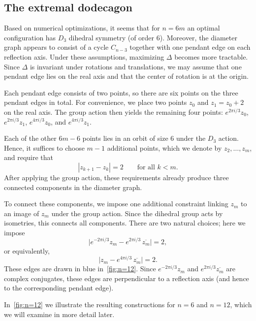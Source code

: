 \documentclass{article}
\theoremstyle{definition}
\begin{document}
\subsection{The extremal dodecagon}

Based on numerical optimizations, it seems that for $n=6m$ an optimal configuration has $D_3$ dihedral symmetry (of order $6$).
Moreover, the diameter graph appears to consist of a cycle $C_{n-3}$ together with one pendant edge on each reflection axis.
Under these assumptions, maximizing $\Delta$ becomes more tractable.
Since $\Delta$ is invariant under rotations and translations, we may assume that one pendant edge lies on the real axis and that the center of rotation is at the origin.

Each pendant edge consists of two points, so there are six points on the three pendant edges in total.
For convenience, we place two points $z_0$ and $z_1=z_0+2$ on the real axis.
The group action then yields the remaining four points:
$e^{2\pi i/3}z_0$, $e^{2\pi i/3}z_1$, $e^{4\pi i/3}z_0$, and $e^{4\pi i/3}z_1$.

Each of the other $6m-6$ points lies in an orbit of size $6$ under the $D_3$ action.
Hence, it suffices to choose $m-1$ additional points, which we denote by $z_2,\dots,z_m$, and require that
\[
|z_{k+1}-z_k|=2 \qquad \text{for all } k<m.
\]
After applying the group action, these requirements already produce three connected components in the diameter graph.

To connect these components, we impose one additional constraint linking $z_m$ to an image of $z_m$ under the group action.
Since the dihedral group acts by isometries, this connects all components.
There are two natural choices; here we impose
\[
\bigl|e^{-2\pi i/3} z_m - e^{2\pi i/3}\,\overline{z_m}\bigr|=2,
\]
or equivalently,
\[
\bigl|z_m - e^{4\pi i/3}\,\overline{z_m}\bigr|=2.
\]
These edges are drawn in blue in~\cref{fig:n=12}.
Since $e^{-2\pi i/3} z_m$ and $e^{2\pi i/3}\overline{z_m}$ are complex conjugates, these edges are perpendicular to a reflection axis (and hence to the corresponding pendant edge).

In~\cref{fig:n=12} we illustrate the resulting constructions for $n=6$ and $n=12$, which we will examine in more detail later.
\end{document}
